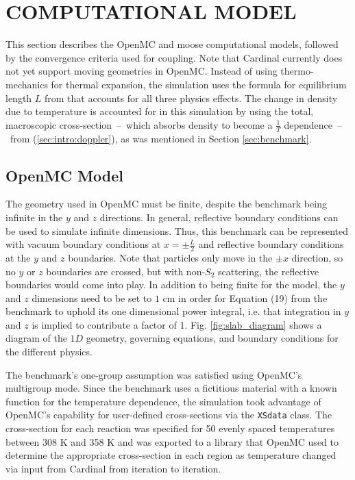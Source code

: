 \documentclass[letterpaper]{mc2023}
\begin{document}
\section{COMPUTATIONAL MODEL}
\label{sec:model}
This section describes the OpenMC and \gls{moose} computational models, followed by the convergence criteria used for coupling.
Note that Cardinal currently does not yet support moving geometries in OpenMC. Instead of using thermo-mechanics for thermal
expansion, the simulation uses the formula for equilibrium length $L$ from \cite{analytical_benchmark} that accounts for all
three physics effects. The change in density due to temperature is accounted for in this simulation by using the total, macroscopic
cross-section\ --\ which absorbs density to become a $\frac{1}{T}$ dependence\ --\ from (\ref{sec:intro:doppler}), as was
mentioned in Section \ref{sec:benchmark}.

\subsection{OpenMC Model}
\label{sec:model:OpenMC}
The geometry used in OpenMC must be finite, despite the benchmark being infinite in the $y$ and $z$ directions. In general,
reflective boundary conditions can be used to simulate infinite dimensions. Thus, this benchmark can be represented with
vacuum boundary conditions at $x=\pm \frac{L}{2}$ and reflective boundary conditions at the $y$ and $z$ boundaries. Note that
particles only move in the $\pm x$ direction, so no $y$ or $z$ boundaries are crossed, but with non-$S_{2}$ scattering, the
reflective boundaries would come into play. In addition to being finite for the model, the $y$ and $z$ dimensions need to be
set to $1$ cm in order for Equation (19) from the benchmark to uphold its one dimensional power integral, i.e. that integration in
$y$ and $z$ is implied to contribute a factor of 1. \cite{analytical_benchmark} Fig. \ref{fig:slab_diagram} shows a diagram
of the $1D$ geometry, governing equations, and boundary conditions for the different physics.

The benchmark's one-group assumption was satisfied using OpenMC's multigroup mode. Since the benchmark uses a fictitious material
with a known function for the temperature dependence, the simulation took advantage of OpenMC's capability for user-defined
cross-sections via the \texttt{XSdata} class. The cross-section for each reaction was specified for 50 evenly spaced temperatures
between 308 K and 358 K and was exported to a library that OpenMC used to determine the appropriate cross-section in each region
as temperature changed via input from Cardinal from iteration to iteration.
\end{document}
